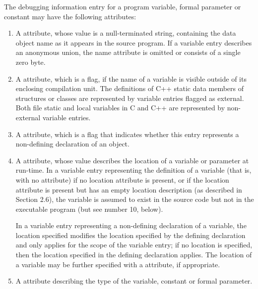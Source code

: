 The debugging information entry for a program variable,
formal parameter or constant may have the following attributes:
\begin{enumerate}[1.]
\item A  attribute, whose value is a null-terminated
string, containing the data object name as it appears in the
source program.  If a variable entry describes an anonymous
union, the name attribute is omitted or consists of a single
zero byte.

\item A  attribute, which is a flag, if the name
of a variable is visible outside of its enclosing compilation
unit.  The definitions of C++ static data members of structures
or classes are represented by variable entries flagged as
external. Both file static and local variables in C and C++
are represented by non-external variable entries.

\item A  attribute, which is a flag that
indicates whether this entry represents a non-defining
declaration of an object.

\item A  attribute, whose value describes the
location of a variable or parameter at run-time.  In a variable
entry representing the definition of a variable (that is,
with no  attribute) if no location attribute
is present, or if the location attribute is present but has
an empty location description (as described in Section 2.6),
the variable is assumed to exist in the source code but not
in the executable program (but see number 10, below).

In a variable entry representing a non-defining declaration of a variable, the location
specified modifies the location specified by the defining declaration and only applies for the
scope of the variable entry; if no location is specified, then the location specified in the
defining declaration applies.
The location of a variable may be further specified with a  attribute, if
appropriate.

\item A  attribute describing the type of the variable,
constant or formal parameter.


\end{enumerate}
